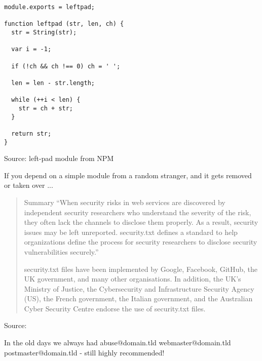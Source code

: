 \documentclass[Screen16to9,17pt]{foils}
\begin{document}


\begin{verbatim}
module.exports = leftpad;

function leftpad (str, len, ch) {
  str = String(str);

  var i = -1;

  if (!ch && ch !== 0) ch = ' ';

  len = len - str.length;

  while (++i < len) {
    str = ch + str;
  }

  return str;
}
\end{verbatim}
Source: left-pad module from NPM

If you depend on a simple module from a random stranger, and it gets removed or taken over ...



\begin{quote}
Summary
“When security risks in web services are discovered by independent security researchers who understand the severity of the risk, they often lack the channels to disclose them properly. As a result, security issues may be left unreported. security.txt defines a standard to help organizations define the process for security researchers to disclose security vulnerabilities securely.”

security.txt files have been implemented by Google, Facebook, GitHub, the UK government, and many other organisations. In addition, the UK’s Ministry of Justice, the Cybersecurity and Infrastructure Security Agency (US), the French government, the Italian government, and the Australian Cyber Security Centre endorse the use of security.txt files.
\end{quote}

Source: 

\begin{list2}
\item In the old days we always had abuse@domain.tld webmaster@domain.tld postmaster@domain.tld - still highly recommended!
\end{list2}

\end{document}
